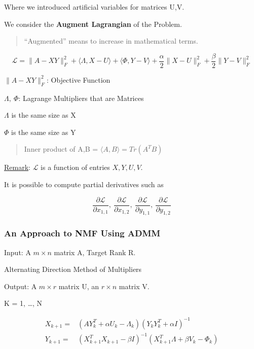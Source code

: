 \documentclass[11pt]{article}
\begin{document}
Where we introduced artificial variables for matrices U,V.

We consider the \textbf{Augment Lagrangian} of the Problem.

\begin{quote}
``Augmented'' means to increase in mathematical terms.
\end{quote}

$$
\mathcal L = \|A - XY\|_F^2 + \langle \Lambda, X - U \rangle + \langle \Phi, Y -
V \rangle + \frac{\alpha}{2} \|X - U\|_F^2 + \frac{\beta}{2} \|Y - V\|_F^2
$$


\(\|A - XY\|_F^2\): Objective Function

\(\Lambda, \ \Phi\): Lagrange Multipliers that are Matrices

\(\Lambda\) is the same size as X

\(\Phi\) is the same size as Y

\begin{quote}
Inner product of A,B = \(\langle A, B \rangle = Tr(A^T B)\)
\end{quote}

\uline{Remark}: \(\mathcal L\) is a function of entries \(X, Y, U, V\).

It is possible to compute partial derivatives such as

$$
\frac{\partial \mathcal L}{\partial x_{1,1}}, \ \frac{\partial \mathcal
L}{\partial x_{1,2}}, \ \frac{\partial \mathcal L}{\partial y_{1,1}}, \ \frac{\partial \mathcal L}{\partial y_{1,2}}
$$

\subsubsection{An Approach to NMF Using ADMM}
\label{sec:orgce33cb0}

Input: A \(m \times n\) matrix A, Target Rank R.

Alternating Direction Method of Multipliers

Output: A \(m \times r\) matrix U, an \(r \times n\) matrix V.

K = 1, \ldots{}, N

\begin{equation}
\begin{split}
X_{k + 1} = & (A Y_k^T + \alpha U_k - \Lambda_k) (Y_k Y_k^T + \alpha I)^{-1}\\
Y_{k + 1} = & (X_{k + 1}^T X_{k + 1} - \beta I)^{-1} (X_{k + 1}^T \Lambda + \beta V_k - \Phi_k)\\
\end{split}
\end{equation}
\end{document}
